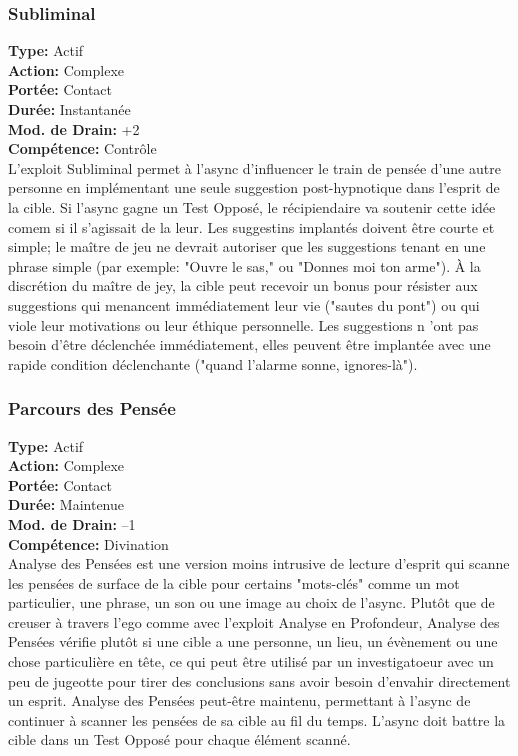 \subsubsection{Subliminal} \textbf{Type:} Actif \\ \textbf{Action:} Complexe \\ \textbf{Portée:} Contact \\ \textbf{Durée:} Instantanée \\ \textbf{Mod. de Drain:} +2 \\ \textbf{Compétence:} Contrôle \\ L'exploit Subliminal permet à l'async d'influencer le train de pensée d'une autre personne en implémentant une seule suggestion post-hypnotique dans l'esprit de la cible. Si l'async gagne un Test Opposé, le récipiendaire va soutenir cette idée comem si il s'agissait de la leur. Les suggestins implantés doivent être courte et simple; le maître de jeu ne devrait autoriser que les suggestions tenant en une phrase simple (par exemple: "Ouvre le sas," ou "Donnes moi ton arme"). À la discrétion du maître de jey, la cible peut recevoir un  bonus pour résister aux suggestions qui menancent immédiatement leur vie ("sautes du pont") ou qui viole leur motivations ou leur éthique personnelle. Les suggestions n 'ont pas besoin d'être déclenchée immédiatement, elles peuvent  être implantée avec une rapide condition déclenchante ("quand l'alarme sonne, ignores-là"). 

\subsubsection{Parcours des Pensée} \textbf{Type:} Actif \\ \textbf{Action:} Complexe \\ \textbf{Portée:} Contact \\ \textbf{Durée:} Maintenue \\ \textbf{Mod. de Drain:} –1 \\ \textbf{Compétence:} Divination \\ Analyse des Pensées est une version moins intrusive de lecture d'esprit qui scanne les pensées de surface de la cible pour certains "mots-clés" comme un mot particulier, une phrase, un son ou une image au choix de l'async. Plutôt que de creuser à travers l'ego comme avec l'exploit Analyse en Profondeur, Analyse des Pensées vérifie plutôt si une cible a une personne, un lieu, un évènement ou une chose particulière en tête, ce qui peut être utilisé par un investigatoeur avec un peu de jugeotte pour tirer des conclusions sans avoir besoin d'envahir directement un esprit. Analyse des Pensées peut-être maintenu, permettant à l'async de continuer à scanner les pensées de sa cible au fil du temps. L'async doit battre la cible dans un Test Opposé pour chaque élément scanné. 


